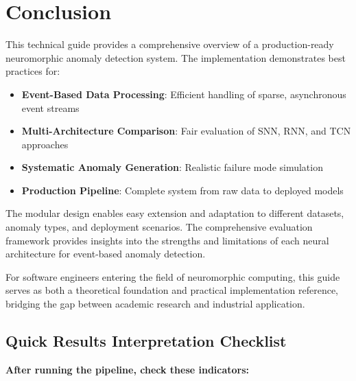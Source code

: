 \documentclass[12pt,a4paper]{article}
\begin{document}
\section{Conclusion}

This technical guide provides a comprehensive overview of a production-ready neuromorphic anomaly detection system. The implementation demonstrates best practices for:

\begin{itemize}
    \item \textbf{Event-Based Data Processing}: Efficient handling of sparse, asynchronous event streams
    \item \textbf{Multi-Architecture Comparison}: Fair evaluation of SNN, RNN, and TCN approaches
    \item \textbf{Systematic Anomaly Generation}: Realistic failure mode simulation
    \item \textbf{Production Pipeline}: Complete system from raw data to deployed models
\end{itemize}

The modular design enables easy extension and adaptation to different datasets, anomaly types, and deployment scenarios. The comprehensive evaluation framework provides insights into the strengths and limitations of each neural architecture for event-based anomaly detection.

For software engineers entering the field of neuromorphic computing, this guide serves as both a theoretical foundation and practical implementation reference, bridging the gap between academic research and industrial application.

\subsection{Quick Results Interpretation Checklist}

\textbf{After running the pipeline, check these indicators:}
\end{document}
